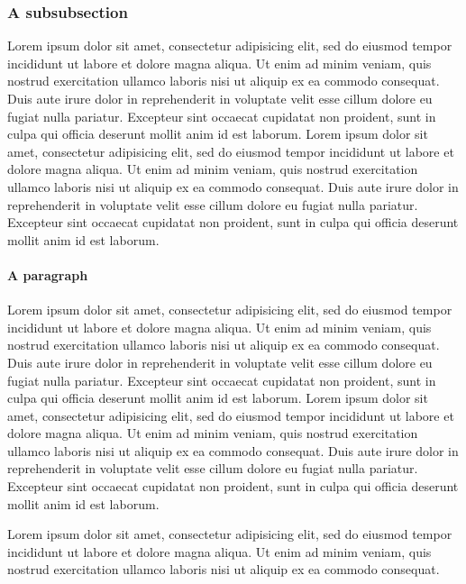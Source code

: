 \documentclass{article}
\begin{document}
\subsubsection{A subsubsection}

Lorem ipsum dolor sit amet, consectetur adipisicing elit, sed do eiusmod tempor incididunt ut labore et dolore magna aliqua. Ut enim ad minim veniam, quis nostrud exercitation ullamco laboris nisi ut aliquip ex ea commodo consequat. Duis aute irure dolor in reprehenderit in voluptate velit esse cillum dolore eu fugiat nulla pariatur. Excepteur sint occaecat cupidatat non proident, sunt in culpa qui officia deserunt mollit anim id est laborum. Lorem ipsum dolor sit amet, consectetur adipisicing elit, sed do eiusmod tempor incididunt ut labore et dolore magna aliqua. Ut enim ad minim veniam, quis nostrud exercitation ullamco laboris nisi ut aliquip ex ea commodo consequat. Duis aute irure dolor in reprehenderit in voluptate velit esse cillum dolore eu fugiat nulla pariatur. Excepteur sint occaecat cupidatat non proident, sunt in culpa qui officia deserunt mollit anim id est laborum.

\paragraph{A paragraph}

Lorem ipsum dolor sit amet, consectetur adipisicing elit, sed do eiusmod tempor incididunt ut labore et dolore magna aliqua. Ut enim ad minim veniam, quis nostrud exercitation ullamco laboris nisi ut aliquip ex ea commodo consequat. Duis aute irure dolor in reprehenderit in voluptate velit esse cillum dolore eu fugiat nulla pariatur. Excepteur sint occaecat cupidatat non proident, sunt in culpa qui officia deserunt mollit anim id est laborum. Lorem ipsum dolor sit amet, consectetur adipisicing elit, sed do eiusmod tempor incididunt ut labore et dolore magna aliqua. Ut enim ad minim veniam, quis nostrud exercitation ullamco laboris nisi ut aliquip ex ea commodo consequat. Duis aute irure dolor in reprehenderit in voluptate velit esse cillum dolore eu fugiat nulla pariatur. Excepteur sint occaecat cupidatat non proident, sunt in culpa qui officia deserunt mollit anim id est laborum.

\begin{theorem}
Lorem ipsum dolor sit amet, consectetur adipisicing elit, sed do eiusmod tempor incididunt ut labore et dolore magna aliqua. Ut enim ad minim veniam, quis nostrud exercitation ullamco laboris nisi ut aliquip ex ea commodo consequat. 
\end{theorem}
\end{document}
